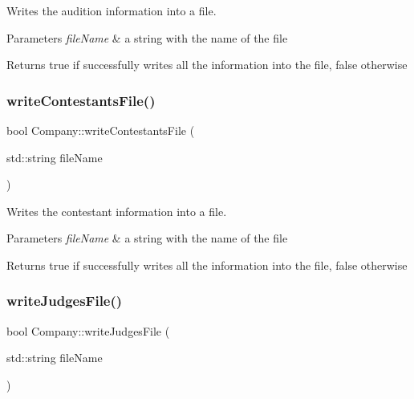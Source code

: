 Writes the audition information into a file. 


\begin{DoxyParams}{Parameters}
{\em file\+Name} & a string with the name of the file \\
\hline
\end{DoxyParams}
\begin{DoxyReturn}{Returns}
true if successfully writes all the information into the file, false otherwise 
\end{DoxyReturn}
\mbox{\label{class_company_aa52ac354a5ab3f0e5bc0712bb48cb7b4}} 
\subsubsection{\texorpdfstring{write\+Contestants\+File()}{writeContestantsFile()}}
{\footnotesize\ttfamily bool Company\+::write\+Contestants\+File (\begin{DoxyParamCaption}\item[{std\+::string}]{file\+Name }\end{DoxyParamCaption})}



Writes the contestant information into a file. 


\begin{DoxyParams}{Parameters}
{\em file\+Name} & a string with the name of the file \\
\hline
\end{DoxyParams}
\begin{DoxyReturn}{Returns}
true if successfully writes all the information into the file, false otherwise 
\end{DoxyReturn}
\mbox{\label{class_company_acfdd8f76389ec02d7ab72625ac1bb9d1}} 
\subsubsection{\texorpdfstring{write\+Judges\+File()}{writeJudgesFile()}}
{\footnotesize\ttfamily bool Company\+::write\+Judges\+File (\begin{DoxyParamCaption}\item[{std\+::string}]{file\+Name }\end{DoxyParamCaption})}



